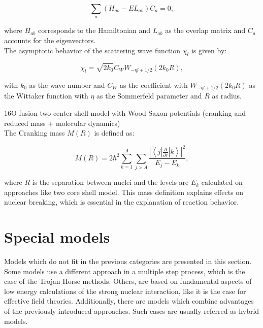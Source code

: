 \documentclass[openany]{book}
\begin{document}
\begin{equation}\label{eq:potential_variational_eigenvalues}
	\sum_{a} (H_{ab} - E L_{ab})C_a = 0,
\end{equation}

where $H_{ab}$ corresponds to the Hamiltonian and $L_{ab}$ as the overlap matrix and $C_a$ accounts for the eigenvectors.  \\

The asymptotic behavior of the scattering wave function $\chi_l$ is given by:


\begin{equation}\label{eq:potential_variational_scattering}
	\chi_l = \sqrt{2k_0} C_W W_{-\eta l + 1/2}(2k_0R),
\end{equation}

with $k_0$ as the wave number and $C_W$ as the coefficient with $ W_{-\eta l + 1/2}(2k_0R)$ as the Wittaker function with $\eta$ as the Sommerfeld parameter and $R$ as radius. 


16O fusion two-center shell model with Wood-Saxon potentials (cranking and reduced mass + molecular dynamics) \cite{diaz-torres_gasques_wiescher_2007} \\

The Cranking mass $M(R)$ is defined as: 

\begin{equation}\label{potential_crankingMass}
	M(R) = 2 \hbar^2 \sum_{k=1}^{A} \sum_{j > A} \frac{\left|\left \langle j | \frac{\partial}{\partial r} | k \right \rangle \right|^2}{E_j - E_k},
\end{equation}

where $R$ is the separation between nuclei and the levels are $E_k$ calculated on approaches like two core shell model. This mass definition explains effects on nuclear breaking, which is essential in the explanation of reaction behavior.


\section{Special models} \label{sec:specialModels}

Models which do not fit in the previous categories are presented in this section. Some models use a different approach in a multiple step process, which is the case of the Trojan Horse methods. Others, are based on fundamental aspects of low energy calculations of the strong nuclear interaction, like it is the case for effective field theories. Additionally, there are models which combine advantages of the previously introduced approaches. Such cases are usually referred as hybrid models.
\end{document}
